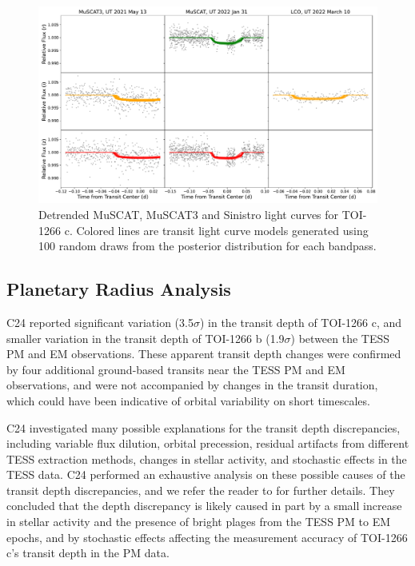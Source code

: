 \documentclass[twocolumn]{aastex631}
\begin{document}
\begin{figure}
\begin{center}
  \includegraphics[width=17.5cm]{1266c_MuSCAT_Mega_Joint_Detrended.pdf}
  \caption{Detrended MuSCAT, MuSCAT3 and Sinistro light curves for TOI-1266 c. Colored lines are transit light curve models generated using 100 random draws from the posterior distribution for each bandpass.}
  \label{fig:MuSCAT c}
\end{center}
\end{figure}


\subsection{Planetary Radius Analysis} \label{sec:radius analysis}

C24 reported significant variation (3.5$\sigma$) in the transit depth of TOI-1266 c, and smaller variation in the transit depth of TOI-1266 b (1.9$\sigma$) between the TESS PM and EM observations. These apparent transit depth changes were confirmed by four additional ground-based transits near the TESS PM and EM observations, and were not accompanied by changes in the transit duration, which could have been indicative of orbital variability on short timescales. 

C24 investigated many possible explanations for the transit depth discrepancies, including variable flux dilution, orbital precession, residual artifacts from different TESS extraction methods, changes in stellar activity, and stochastic effects in the TESS data. C24 performed an exhaustive analysis on these possible causes of the transit depth discrepancies, and we refer the reader to \cite{Cloutier_2024} for further details. They concluded that the depth discrepancy is likely caused in part by a small increase in stellar activity and the presence of bright plages from the TESS PM to EM epochs, and by stochastic effects affecting the measurement accuracy of TOI-1266 c's transit depth in the PM data. 
\end{document}
